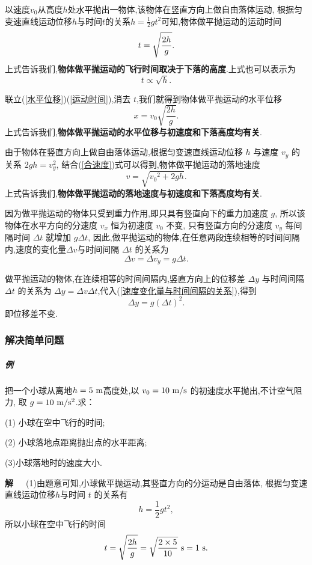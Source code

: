\documentclass[11pt,a4paper]{ctexart}
\newcounter{exam}[section]
\begin{document}
以速度$v_0$从高度$h$处水平抛出一物体,该物体在竖直方向上做自由落体运动,
根据匀变速直线运动位移$h$与时间$t$的关系$h=\displaystyle\frac{1}{2}gt^2$可知,物体做平抛运动的运动时间
\begin{equation}
	\setlength{\abovedisplayskip}{3pt}
	\setlength{\belowdisplayskip}{3pt}
	\label{运动时间}
	t=\sqrt{\frac{2h}{g}}.
\end{equation}
上式告诉我们,\textbf{物体做平抛运动的飞行时间取决于下落的高度}.上式也可以表示为$$t\propto \sqrt{h}.$$

联立(\ref{水平位移})(\ref{运动时间}),消去 $t$,我们就得到物体做平抛运动的水平位移
$$x=v_0\sqrt{\frac{2h}{g}}.$$
上式告诉我们,\textbf{物体做平抛运动的水平位移与初速度和下落高度均有关}.

由于物体在竖直方向上做自由落体运动,根据匀变速直线运动位移 $h$ 与速度 $v_y$ 的关系 $2gh=v_y^2$,
结合(\ref{合速度})式可以得到,物体做平抛运动的落地速度
$$v=\sqrt{{v_0}^2+2gh}.$$
上式告诉我们,\textbf{物体做平抛运动的落地速度与初速度和下落高度均有关}.

因为做平抛运动的物体只受到重力作用,即只具有竖直向下的重力加速度 $g$,
所以该物体在水平方向的分速度 $v_x$ 恒为初速度 $v_0$ 不变,
只有竖直方向的分速度 $v_y$ 每间隔时间 $\Delta t$ 就增加 $g\Delta{t}$,
因此,做平抛运动的物体,在任意两段连续相等的时间间隔内,速度的变化量$\Delta{v}$与时间间隔 $\Delta{t}$ 的关系为
\begin{equation}
	\label{速度变化量与时间间隔的关系}
	\Delta{v}=\Delta{v_y}=g \Delta t.
\end{equation}

做平抛运动的物体,在连续相等的时间间隔内,竖直方向上的位移差 $\Delta{y}$ 与时间间隔 $\Delta t$
的关系为 $\Delta{y}=\Delta{v} \Delta t$,代入(\ref{速度变化量与时间间隔的关系}),得到
$$\Delta{y}=g(\Delta{t})^2.$$
即位移差不变.

\subsubsection{解决简单问题}
\subparagraph{例\theexam}
把一个小球从离地$h=5\ \rm{m}$高度处,以 $v_0=10\ \rm{m/s}$ 的初速度水平抛出,不计空气阻力,
取 $g=10\ \rm{m/s^2}$.求：

(1) 小球在空中飞行的时间;

(2) 小球落地点距离抛出点的水平距离;

(3)小球落地时的速度大小.

\textbf{解}\ \ \ (1)由题意可知,小球做平抛运动,其竖直方向的分运动是自由落体,
根据匀变速直线运动位移$h$与时间 $t$ 的关系有 $$h=\frac12gt^2, $$
所以小球在空中飞行的时间
$$t=\sqrt{\frac{2h}{g}}=\sqrt{\frac{2\times5}{10}}\ \rm{s}=1\ \rm{s}.$$
\end{document}
